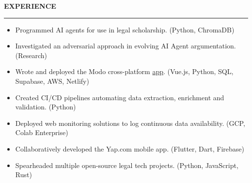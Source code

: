 \documentclass[11pt, letterpaper]{article}
\newcommand\sectionTitle[1]{%
    \begingroup
        \textbf{\MakeUppercase{#1}}
        \vspace{0.4em}
        \hrule
        \vspace{-0.3em}
    \endgroup
}%
\newenvironment{experienceSection}[1]{%
    \sectionTitle{#1}%
    \begin{list}{}{ %
        \setlength{\leftmargin}{0em} %
    }%
        \item[]%
    }{%
    \end{list}%
}%
\begin{document}
\begin{experienceSection}{Experience}

    \experienceItem[
        company={SMU Yong Pung How School of Law},
        location={Singapore},
        position={Research Assistant},
        duration={Jan. 2025 - Apr. 2025}
    ]
    \begin{itemize}
        \setlength{\itemsep}{-6pt}
        \item Programmed AI agents for use in legal scholarship. (Python, ChromaDB)
        \item Investigated an adversarial approach in evolving AI Agent argumentation. (Research)
    \end{itemize}

    \experienceItem[
        company={The Modo Collective},
        location={Singapore},
        position={Founder \& Lead Developer},
        duration={Aug. 2024 - Mar. 2025}
    ]
    \begin{itemize}
        \setlength{\itemsep}{-6pt}
        \item Wrote and deployed the Modo cross-platform \href{https://modo-live.netlify.app/}{app}. (Vue.js, Python, SQL, Supabase, AWS, Netlify)
    \end{itemize}

    \experienceItem[
        company={Elefant},
        location={Singapore},
        position={Backend Development Intern},
        duration={Sep. 2024 - Dec. 2024}
    ]
    \begin{itemize}
        \setlength{\itemsep}{-6pt}
        \item Created CI/CD pipelines automating data extraction, enrichment and validation. (Python)
        \item Deployed web monitoring solutions to log continuous data availability. (GCP, Colab Enterprise)
    \end{itemize}

    \experienceItem[
        company={The Yap Labs},
        location={Singapore},
        position={Co-founder \& Tech Development Head},
        duration={Apr. 2024 - Aug. 2024}
    ]
    \begin{itemize}
        \setlength{\itemsep}{-6pt}
        \item Collaboratively developed the Yap.com mobile app. (Flutter, Dart, Firebase)
    \end{itemize}

    \experienceItem[
        company={SMU Legal Innovation and Technology (LIT)},
        location={Singapore},
        position={Tech Development Director},
        duration={Aug. 2023 - Aug. 2024}
    ]
    \begin{itemize}
        \setlength{\itemsep}{-6pt}
        \item Spearheaded multiple open-source legal tech projects. (Python, JavaScript, Rust)
    \end{itemize}

\end{experienceSection}
\end{document}
